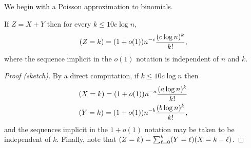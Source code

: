 \documentclass[EJP,final]{ejpecp}
\newcommand{\1}[1]{\mathbbm{1}_{\{#1\}}}
\let\Pr\relax
\DeclareMathOperator{\Pr}{Pr}
\begin{document}
We begin with a Poisson approximation to binomials.
\begin{lemma}\label{lem:poisson}
  If $Z = X + Y$ then for every $k \le 10 c \log n$,
  \[
      \Pr(Z = k) = (1 + o(1)) n^{-c} \frac{(c \log n)^k}{k!},
  \]
  where the sequence implicit in the $o(1)$ notation is independent of $n$ and $k$.
\end{lemma}

\begin{proof}[Proof (sketch)]
  By a direct computation, if $k \le 10 c \log n$ then
  \begin{align*}
    \Pr(X = k) = (1 + o(1)) n^{-a} \frac{(a \log n)^k}{k!} \\
    \Pr(Y = k) = (1 + o(1)) n^{-b} \frac{(b \log n)^k}{k!},
  \end{align*}
  and the sequences implicit in the $1 + o(1)$ notation may be taken to be
  independent of $k$. Finally, note that
  $\Pr(Z = k) = \sum_{\ell=0}^k \Pr(Y = \ell) \Pr(X = k - \ell)$.
\end{proof}
\end{document}
